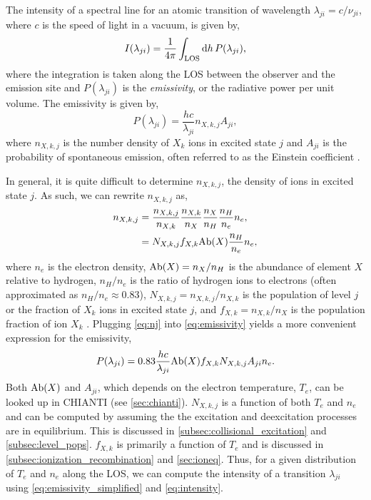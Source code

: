 The intensity of a spectral line for an atomic transition of wavelength $\lambda_{ji}=c/\nu_{ji}$, where $c$ is the speed of light in a vacuum, is given by,
\begin{equation}\label{eq:intensity}
    I(\lambda_{ji}) = \frac{1}{4\pi}\int_\textup{LOS}\textup{d}h\,P(\lambda_{ji}),
\end{equation}
where the integration is taken along the LOS between the observer and the emission site and $P(\lambda_{ji})$ is the \textit{emissivity}, or the radiative power per unit volume. The emissivity is given by,
\begin{equation}\label{eq:emissivity}
    P(\lambda_{ji}) = \frac{hc}{\lambda_{ji}}n_{X,k,j}A_{ji},
\end{equation}
where $n_{X,k,j}$ is the number density of $X_k$ ions in excited state $j$ and $A_{ji}$ is the probability of spontaneous emission, often referred to as the Einstein coefficient \citep{bradshaw_collisional_2013,del_zanna_solar_2018}.

In general, it is quite difficult to determine $n_{X,k,j}$, the density of ions in excited state $j$. As such, we can rewrite $n_{X,k,j}$ as,
\begin{align}\label{eq:nj}
    n_{X,k,j} &= \frac{n_{X,k,j}}{n_{X,k}}\frac{n_{X,k}}{n_X}\frac{n_X}{n_H}\frac{n_H}{n_e}n_e, \nonumber\\
              &= N_{X,k,j}f_{X,k}\textup{Ab}(X)\frac{n_H}{n_e}n_e,
\end{align}
where $n_e$ is the electron density, $\textup{Ab}(X)=n_X/n_H$ is the abundance of element $X$ relative to hydrogen, $n_H/n_e$ is the ratio of hydrogen ions to electrons (often approximated as $n_H/n_e\approx0.83$), $N_{X,k,j}=n_{X,k,j}/n_{X,k}$ is the population of level $j$ or the fraction of $X_k$ ions in excited state $j$, and $f_{X,k}=n_{X,k}/n_X$ is the population fraction of ion $X_k$ \citep{del_zanna_solar_2018}. Plugging \autoref{eq:nj} into \autoref{eq:emissivity} yields a more convenient expression for the emissivity,
\begin{equation}\label{eq:emissivity_simplified}
    P(\lambda_{ji}) = 0.83\frac{hc}{\lambda_{ji}}\textup{Ab}(X)f_{X,k}N_{X,k,j}A_{ji}n_e.
\end{equation}
Both $\textup{Ab}(X)$ and $A_{ji}$, which depends on the electron temperature, $T_e$, can be looked up in CHIANTI (see \autoref{sec:chianti}). $N_{X,k,j}$ is a function of both $T_e$ and $n_e$ and can be computed by assuming the the excitation and deexcitation processes are in equilibrium. This is discussed in \autoref{subsec:collisional_excitation} and \autoref{subsec:level_pops}. $f_{X,k}$ is primarily a function of $T_e$ and is discussed in \autoref{subsec:ionization_recombination} and \autoref{sec:ioneq}. Thus, for a given distribution of $T_e$ and $n_e$ along the LOS, we can compute the intensity of a transition $\lambda_{ji}$ using \autoref{eq:emissivity_simplified} and \autoref{eq:intensity}.

